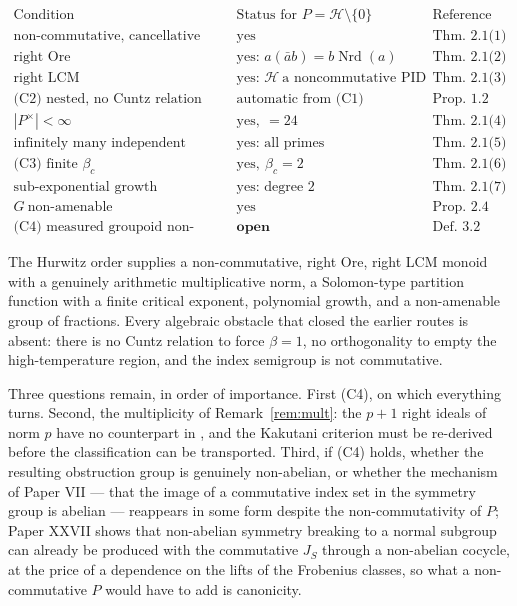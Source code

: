 \documentclass[11pt]{amsart}
\numberwithin{equation}{section}
\theoremstyle{definition}
\theoremstyle{remark}
\newcommand{\cH}{\mathcal{H}}
\newcommand{\Nrd}{\operatorname{Nrd}}
\begin{document}
\[
\begin{array}{lll}
\text{Condition} & \text{Status for }P=\cH\setminus\{0\} & \text{Reference}\\\hline
\text{non-commutative, cancellative} & \text{yes} & \text{Thm.~2.1(1)}\\
\text{right Ore} & \text{yes: }a(\bar ab)=b\Nrd(a) & \text{Thm.~2.1(2)}\\
\text{right LCM} & \text{yes: }\cH\ \text{a noncommutative PID} & \text{Thm.~2.1(3)}\\
\text{(C2) nested, no Cuntz relation} & \text{automatic from (C1)} & \text{Prop.~1.2}\\
|P^\times|<\infty & \text{yes},\ =24 & \text{Thm.~2.1(4)}\\
\text{infinitely many independent norms} & \text{yes: all primes} & \text{Thm.~2.1(5)}\\
\text{(C3) finite }\beta_c & \text{yes},\ \beta_c=2 & \text{Thm.~2.1(6)}\\
\text{sub-exponential growth} & \text{yes: degree }2 & \text{Thm.~2.1(7)}\\
G\ \text{non-amenable} & \text{yes} & \text{Prop.~2.4}\\
\text{(C4) measured groupoid non-amenable} & \textbf{open} & \text{Def.~3.2}
\end{array}
\]

The Hurwitz order supplies a non-commutative, right Ore, right LCM monoid with a genuinely
arithmetic multiplicative norm, a Solomon-type partition function with a finite critical
exponent, polynomial growth, and a non-amenable group of fractions. Every algebraic obstacle
that closed the earlier routes is absent: there is no Cuntz relation to force $\beta=1$, no
orthogonality to empty the high-temperature region, and the index semigroup is not
commutative.

Three questions remain, in order of importance. First (C4), on which everything turns. Second,
the multiplicity of Remark~\ref{rem:mult}: the $p+1$ right ideals of norm $p$ have no
counterpart in \cite{Main}, and the Kakutani criterion must be re-derived before the
classification can be transported. Third, if (C4) holds, whether the resulting obstruction
group is genuinely non-abelian, or whether the mechanism of Paper VII --- that the image of
a commutative index set in the symmetry group is abelian --- reappears in some form despite
the non-commutativity of $P$; Paper XXVII shows that non-abelian symmetry breaking to a
normal subgroup can already be produced with the commutative $J_S$ through a non-abelian
cocycle, at the price of a dependence on the lifts of the Frobenius classes, so what a
non-commutative $P$ would have to add is canonicity.
\end{document}
